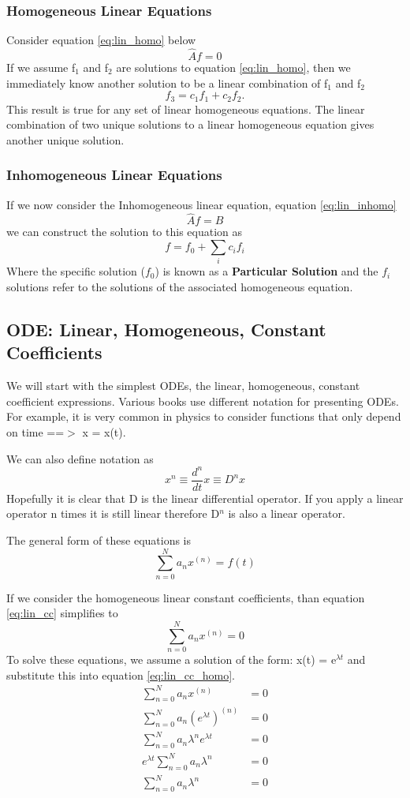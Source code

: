 \documentclass{article}
\newcommand{\be}{\begin{equation}}
\newcommand{\ee}{\end{equation}}
\begin{document}
\subsubsection*{Homogeneous Linear Equations}
Consider equation \ref{eq:lin_homo} below
\be \label{eq:lin_homo}
\hat{A}f = 0
\ee
If we assume f$_1$ and f$_2$ are solutions to equation \ref{eq:lin_homo}, then we immediately know another solution to be a linear combination of f$_1$ and f$_2$
\be
f_3 = c_1f_1 + c_2f_2 .
\ee
This result is true for any set of linear homogeneous equations.
The linear combination of two unique solutions to a linear homogeneous equation gives another unique solution.

\subsubsection*{Inhomogeneous Linear Equations}
If we now consider the Inhomogeneous linear equation, equation \ref{eq:lin_inhomo}
\be \label{eq:lin_inhomo}
\hat{A}f = B
\ee
we can construct the solution to this equation as
\be
f = f_0 + \sum_i c_i f_i
\ee
Where the specific solution ($f_0$) is known as a \textbf{Particular Solution} and the $f_i$ solutions refer to the solutions of the associated homogeneous equation.

\subsection*{ODE: Linear, Homogeneous, Constant Coefficients}
We will start with the simplest ODEs, the linear, homogeneous, constant coefficient expressions.
Various books use different notation for presenting ODEs.
For example, it is very common in physics to consider functions that only depend on time ==$>$ x = x(t).

We can also define notation as
\be
x^n \equiv \frac{d^n}{dt}x \equiv D^n x
\ee
Hopefully it is clear that D is the linear differential operator.
If you apply a linear operator n times it is still linear therefore D$^n$ is also a linear operator.

The general form of these equations is
\be \label{eq:lin_cc}
\sum_{n=0}^N a_nx^{(n)} = f(t)
\ee

If we consider the homogeneous linear constant coefficients, than equation \ref{eq:lin_cc} simplifies to
\be \label{eq:lin_cc_homo}
\sum_{n=0}^N a_nx^{(n)} = 0
\ee
To solve these equations, we assume a solution of the form: x(t) = e$^{\lambda t}$ and substitute this into equation \ref{eq:lin_cc_homo}.
\be
\begin{split}
    \sum_{n=0}^N a_nx^{(n)} &= 0\\
    \sum_{n=0}^N a_n \left(e^{\lambda t}\right) ^{(n)} &= 0\\
    \sum_{n=0}^N a_n \lambda^n e^{\lambda t} &= 0\\
    e^{\lambda t} \sum_{n=0}^N a_n \lambda^n &= 0\\
    \sum_{n=0}^N a_n \lambda^n &= 0\\
\end{split}
\ee
\end{document}
